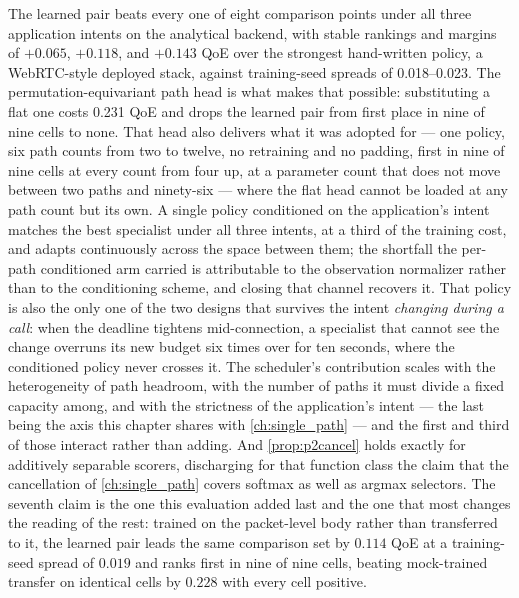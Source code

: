 The learned pair beats every one of eight comparison points under all three application intents on the
analytical backend, with stable rankings and margins of $+0.065$, $+0.118$, and $+0.143$ QoE over the
strongest hand-written policy, a WebRTC-style deployed stack, against training-seed spreads of
0.018--0.023. The permutation-equivariant path head is what makes that possible: substituting a flat one
costs 0.231 QoE and drops the learned pair from first place in nine of nine cells to none. That head
also delivers what it was adopted for --- one policy, six path counts from two to twelve, no retraining
and no padding, first in nine of nine cells at every count from four up, at a parameter count that does
not move between two paths and ninety-six --- where the flat head cannot be loaded at any path count but
its own. A single policy conditioned on the application's intent matches the best specialist under all
three intents, at a third of the training cost, and adapts continuously across the space between them;
the shortfall the per-path conditioned arm carried is attributable to the observation normalizer rather
than to the conditioning scheme, and closing that channel recovers it. That policy is also the only one
of the two designs that survives the intent \emph{changing during a call}: when the deadline tightens
mid-connection, a specialist that cannot see the change overruns its new budget six times over for ten
seconds, where the conditioned policy never crosses it. The scheduler's contribution
scales with the heterogeneity of path headroom, with the number of paths it must divide a fixed capacity
among, and with the strictness of the application's intent --- the last being the axis this chapter
shares with \cref{ch:single_path} --- and the first and third of those interact rather than adding. And
\cref{prop:p2cancel} holds exactly for additively separable scorers, discharging for that function class
the claim that the cancellation of \cref{ch:single_path} covers softmax as well as argmax selectors.
The seventh claim is the one this evaluation added last and the one that most changes the reading of the
rest: trained on the packet-level body rather than transferred to it, the learned pair leads the same
comparison set by $0.114$ QoE at a training-seed spread of $0.019$ and ranks first in nine of nine
cells, beating mock-trained transfer on identical cells by $0.228$ with every cell positive.

